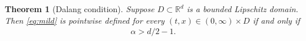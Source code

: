 \documentclass[reqno]{amsart}
\newcommand{\R}{\mathbb R}
\newcommand{\E}{\mathbb E}
\renewcommand{\d}{\mathrm d}
\newcommand{\e}{\mathrm e}
\newcommand{\1}{\mathbf 1}
\numberwithin{equation}{section}
\newtheorem{theorem}{Theorem}[section]
\theoremstyle{definition}
\begin{document}
\begin{theorem}[Dalang condition]
\label{thm:exist}
Suppose $D \subset \R^d$ is a bounded Lipschitz domain.
Then \eqref{eq:mild} is pointwise defined for every $(t,x) \in (0,\infty)\times D$ if and only if
\begin{align}\label{Dalang}
	\alpha>d/2-1.
\end{align}
\end{theorem}



\end{document}
